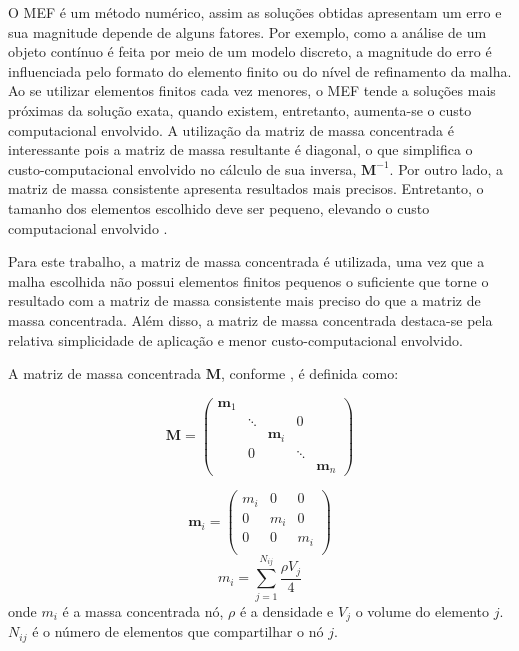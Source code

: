 O MEF é um método numérico, assim as soluções obtidas apresentam um erro e sua magnitude depende de alguns fatores. Por exemplo, como a análise de um objeto contínuo é feita por meio de um modelo discreto, a magnitude do erro é influenciada pelo formato do elemento finito ou do nível de refinamento da malha. Ao se utilizar elementos finitos cada vez menores, o MEF tende a soluções mais próximas da solução exata, quando existem, entretanto, aumenta-se o custo computacional envolvido. 
A utilização da matriz de massa concentrada é interessante pois a matriz de massa resultante é diagonal, o que simplifica o custo-computacional envolvido no cálculo de sua inversa, $\pmb{M}^{-1}$.
Por outro lado, a matriz de massa consistente apresenta resultados mais precisos. Entretanto, o tamanho dos elementos escolhido deve ser pequeno, elevando o custo computacional envolvido \cite{Chen2017numerical}.

Para este trabalho, a matriz de massa concentrada é utilizada, uma vez que a malha escolhida não possui elementos finitos pequenos o suficiente que torne o resultado com a matriz de massa consistente mais preciso do que a matriz de massa concentrada. Além disso, a matriz de massa concentrada destaca-se pela relativa simplicidade de aplicação e menor custo-computacional envolvido.

A matriz de massa concentrada $\pmb{M}$, conforme \cite{Chen2017numerical}, é definida como:

\begin{equation} \label{eq:massmatrix}
    \pmb{M} = 
    \begin{pmatrix}
    \pmb{m}_{1} &        &   &    &  \\
                & \ddots &   &  0 &  \\
                &        & \pmb{m}_{i} & & \\
                & 0      &             &  \ddots &\\
                & & & & \pmb{m}_{n}
    \end{pmatrix}
\end{equation}

\begin{equation} \label{eq:mass}
\pmb{m}_{i} =
\begin{pmatrix}
    m_{i} & 0 & 0 \\
    0 & m_{i} & 0 \\
    0 & 0 & m_{i} \\
\end{pmatrix}
\end{equation}
\begin{equation}
    m_{i} = \sum_{j=1}^{N_{ij}} \frac{\rho V_{j}}{4}    
\end{equation}
onde $m_{i}$ é a massa concentrada nó, $\rho$ é a densidade e $V_{j}$ o volume do elemento $j$. $N_{ij}$ é o número de elementos que compartilhar o nó $j$.

